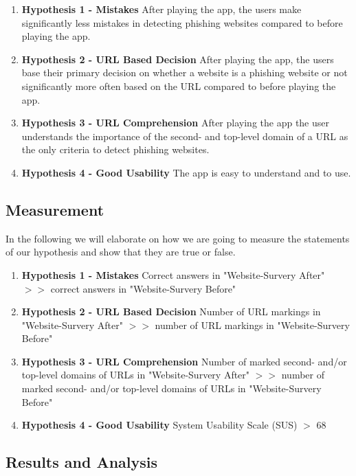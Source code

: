 \begin{enumerate}
	\item \textbf{Hypothesis 1 - Mistakes} After playing the app, the users make significantly less mistakes in detecting phishing websites compared to before playing the app.

	\item \textbf{Hypothesis 2 - URL Based Decision} After playing the app, the users base their primary decision on whether a website is a phishing website or not significantly more often based on the URL compared to before playing the app.

	\item \textbf{Hypothesis 3 - URL Comprehension} After playing the app the user understands the importance of the second- and top-level domain of a URL as the only criteria to detect phishing websites.

	\item \textbf{Hypothesis 4 - Good Usability} The app is easy to understand and to use.

\end{enumerate}


\subsection{Measurement}
In the following we will elaborate on how we are going to measure the statements of our hypothesis and show that they are true or false.


\begin{enumerate}
	\item \textbf{Hypothesis 1 - Mistakes} Correct answers in "Website-Survery After" $>>$ correct answers in "Website-Survery Before" 
	\item \textbf{Hypothesis 2 - URL Based Decision} Number of URL markings in "Website-Survery After" $>>$ number of URL markings in "Website-Survery Before" 
	\item \textbf{Hypothesis 3 - URL Comprehension} Number of marked second- and/or top-level domains of URLs in "Website-Survery After"  $>>$ number of marked second- and/or top-level domains of URLs in "Website-Survery Before" 
	\item \textbf{Hypothesis 4 - Good Usability} System Usability Scale (SUS) $>$ 68
\end{enumerate}

\subsection{Results and Analysis}
